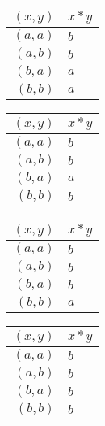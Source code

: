 \begin{enumerate}[label={\Alph*.},font={\bfseries}]
\begin{enumerate}[label={\arabic*},font={\bfseries}]
\begin{minipage}[h]{.25\textwidth}
\begin{tabular}{ r | l }
          \end{tabular}
        \end{minipage}
        \begin{minipage}[h]{.25\textwidth}
          \begin{tabular}{ r | l }
            $(x,y)$ & $x*y$ \\
            \hline
            $(a,a)$ & $b$ \\
            $(a,b)$ & $b$ \\
            $(b,a)$ & $a$ \\
            $(b,b)$ & $a$
          \end{tabular}
        \end{minipage}
        \begin{minipage}[h]{.25\textwidth}
          \begin{tabular}{ r | l }
            $(x,y)$ & $x*y$ \\
            \hline
            $(a,a)$ & $b$ \\
            $(a,b)$ & $b$ \\
            $(b,a)$ & $a$ \\
            $(b,b)$ & $b$
          \end{tabular}
        \end{minipage}
        \begin{minipage}[h]{.25\textwidth}
          \begin{tabular}{ r | l }
            $(x,y)$ & $x*y$ \\
            \hline
            $(a,a)$ & $b$ \\
            $(a,b)$ & $b$ \\
            $(b,a)$ & $b$ \\
            $(b,b)$ & $a$
          \end{tabular}
        \end{minipage}
        \begin{minipage}[h]{.25\textwidth}
          \begin{tabular}{ r | l }
            $(x,y)$ & $x*y$ \\
            \hline
            $(a,a)$ & $b$ \\
            $(a,b)$ & $b$ \\
            $(b,a)$ & $b$ \\
            $(b,b)$ & $b$
          \end{tabular}

\end{minipage}
\end{enumerate}
\end{enumerate}
